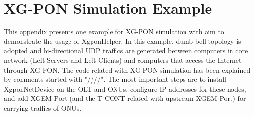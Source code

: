 \section{XG-PON Simulation Example}
This appendix presents one example for XG-PON simulation with aim
to demonstrate the usage of XgponHelper. In this example,
dumb-bell topology is adopted and bi-directional UDP traffics are
generated between computers in core network (Left Servers and Left
Clients) and computers that access the Internet through XG-PON.
The code related with XG-PON simulation has been explained by
comments started with "////". The most important steps are to
install XgponNetDevice on the OLT and ONUs, configure IP addresses
for these nodes, and add XGEM Port (and the T-CONT related with
upstream XGEM Port) for carrying traffics of ONUs.


\lstset{language=C++, basicstyle=\scriptsize} %
